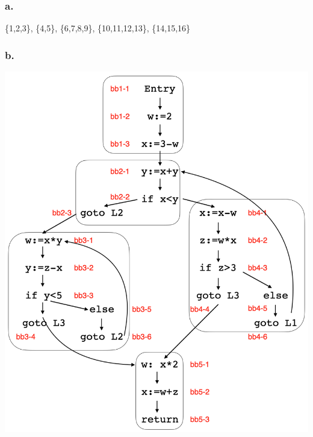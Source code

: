 \documentclass{article}
\begin{document}
	\subsubsection*{a.}
	\{1,2,3\}, \{4,5\}, \{6,7,8,9\}, \{10,11,12,13\}, \{14,15,16\}
	
	\subsubsection*{b.}
	\begin{center}
		\includegraphics[width=1.1\textwidth]{p3b-1}
	\end{center}
	
\end{document}
